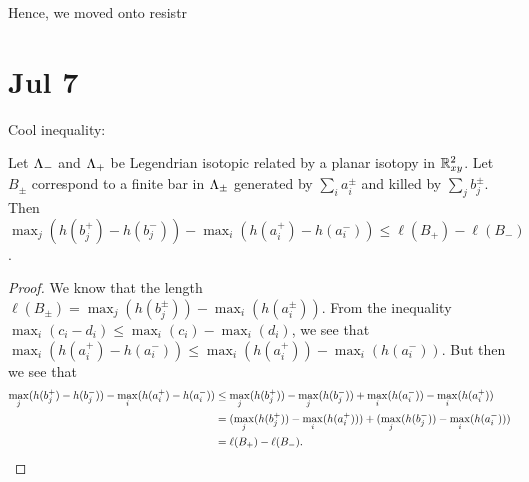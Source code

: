 \documentclass[11pt,oneside]{amsart}
\begin{document}
Hence, we moved onto resistr


\section{Jul 7}

Cool inequality:
\begin{theorem}
    Let $\Lambda_-$ and $\Lambda_+$ be Legendrian isotopic related by a planar isotopy in $\mathbb R^2_{xy}$. Let $B_\pm$ correspond to a finite bar in $\Lambda_\pm$ generated by $\sum_{i}a_i^{\pm}$ and killed by $\sum_{j}b_j^{\pm}$. Then $\max_j(h(b_j^+)-h(b_j^-))-\max_i(h(a_i^+)-h(a_i^-))\leq \ell(B_+)-\ell(B_-)$.
\end{theorem}
\begin{proof}
    We know that the length $\ell(B_\pm)=\max_j(h(b_j^\pm))-\max_i(h(a_i^\pm))$. From the inequality $\max_i(c_i-d_i)\leq \max_i(c_i)-\max_i(d_i)$, we see that $\max_i(h(a_i^+)-h(a_i^-))\leq \max_i(h(a_i^+))-\max_i(h(a_i^-))$. But then we see that
    \begin{align*}
        \max_j(h(b_j^+)-h(b_j^-))-\max_i(h(a_i^+)-h(a_i^-))&\leq \max_j(h(b_j^+))-\max_j(h(b_j^-))+\max_i(h(a_i^-))-\max_i(h(a_i^+))\\&=(\max_j(h(b_j^+))-\max_i(h(a_i^+)))+(\max_j(h(b_j^-))-\max_i(h(a_i^-)))\\&=\ell(B_+)-\ell(B_-).\qedhere
    \end{align*}
\end{proof}
\end{document}
